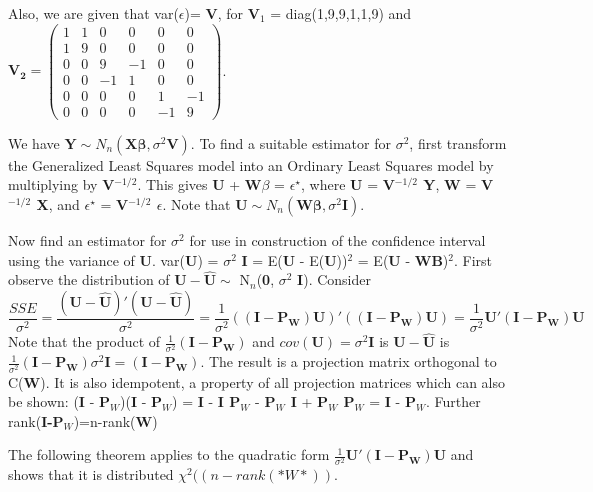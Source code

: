 \documentclass[11pt]{article}
\begin{document}
Also, we are given that var($\epsilon$)= \textbf{V}, for \textbf{V$_1$} =
diag(1,9,9,1,1,9) and \( \mathbf{V_2} = \begin{pmatrix}
1 & 1 & 0 & 0 & 0 & 0 \\
1 & 9 & 0 & 0 & 0 & 0 \\
0 & 0 & 9 & -1& 0 & 0 \\
0 & 0 & -1& 1 & 0 & 0 \\
0 & 0 & 0 & 0 & 1 & -1 \\
0 & 0 & 0 & 0 & -1 & 9
\end{pmatrix} \).

We have $\mathbf{Y} \sim N_n(\mathbf{X\beta},\sigma^2\mathbf{V})$. To
find a suitable estimator for $\sigma$$^2$, first transform the
Generalized Least Squares model into an Ordinary Least Squares model
by multiplying by \textbf{V$^{\mathrm{-1/2}}$}. This gives \textbf{U} + \textbf{W$\beta$} =
$\epsilon^{\star}$, where \textbf{U} = \textbf{V$^{\mathrm{-1/2}}$ Y}, \textbf{W} = \textbf{V$^{\mathrm{-1/2}}$ X}, and
$\epsilon^{\star}$ = \textbf{V$^{\mathrm{-1/2}}$ $\epsilon$}. Note that $\mathbf{U} \sim
N_n(\mathbf{W\beta}, \sigma^2 \mathbf{I})$. 

Now find an estimator for $\sigma$$^2$ for use in construction of the
confidence interval using the variance of \textbf{U}. var(\textbf{U}) = $\sigma$$^2$ \textbf{I}
= E(\textbf{U} - E(\textbf{U}))$^2$ = E(\textbf{U} - \textbf{WB})$^2$. First observe the distribution
of $\mathbf{U} - \hat{\mathbf{U}} \sim$ N$_n$(\textbf{0}, $\sigma$$^2$ \textbf{I}). 
Consider $$ \frac{SSE}{\sigma^2} =
\frac{(\mathbf{U}-\hat{\mathbf{U}})'(\mathbf{U}-\hat{\mathbf{U}})}{\sigma^2}
=\frac{1}{\sigma^2}
((\mathbf{I}-\mathbf{P_W})\mathbf{U})'((\mathbf{I}-\mathbf{P_W})\mathbf{U})
= \frac{1}{\sigma^2} \mathbf{U}'(\mathbf{I} -
\mathbf{P_W})\mathbf{U}$$
Note that the product of $\frac{1}{\sigma^2}(\mathbf{I} -
\mathbf{P_W})$ and $cov(\mathbf{U}) = \sigma^2 \mathbf{I}$ is $\mathbf{U} - \hat{\mathbf{U}}$
is  $\frac{1}{\sigma^2}(\mathbf{I} -
\mathbf{P_W}) \sigma^2 \mathbf{I} = (\mathbf{I} - \mathbf{P_W})$.
The result is a projection matrix orthogonal to C(\textbf{W}). It is also
idempotent, a property of all projection matrices which can also be
shown: (\textbf{I} - \textbf{P$_W$})(\textbf{I} - \textbf{P$_W$}) = \textbf{I} - \textbf{I P$_W$} - \textbf{P$_W$ I} + \textbf{P$_W$ P$_W$} = \textbf{I} - \textbf{P$_W$}. Further rank(\textbf{I-P$_W$})=n-rank(\textbf{W})

The following theorem applies to the  quadratic form $\frac{1}{\sigma^2} \mathbf{U}'(\mathbf{I} -
\mathbf{P_W})\mathbf{U}$ and shows that it is distributed
$\chi^2((n-rank(*W*))$.
\end{document}
